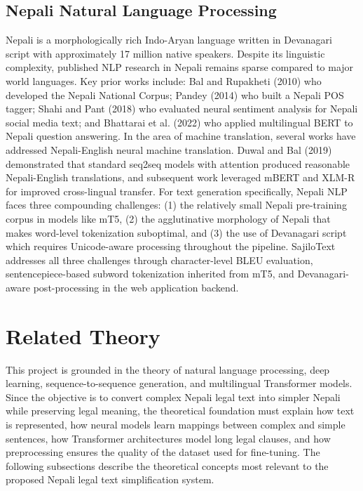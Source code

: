 \documentclass[12pt]{report}
\begin{document}
\subsection{Nepali Natural Language Processing} 
Nepali is a morphologically rich Indo-Aryan language written in Devanagari script with approximately 17 million native speakers. Despite its linguistic complexity, published NLP research in Nepali remains sparse compared to major world languages.
Key prior works include: Bal and Rupakheti (2010) who developed the Nepali National Corpus; Pandey (2014) who built a Nepali POS tagger; Shahi and Pant (2018) who evaluated neural sentiment analysis for Nepali social media text; and Bhattarai et al. (2022) who applied multilingual BERT to Nepali question answering.
In the area of machine translation, several works have addressed Nepali-English neural machine translation. Duwal and Bal (2019) demonstrated that standard seq2seq models with attention produced reasonable Nepali-English translations, and subsequent work leveraged mBERT and XLM-R for improved cross-lingual transfer.
For text generation specifically, Nepali NLP faces three compounding challenges: (1) the relatively small Nepali pre-training corpus in models like mT5, (2) the agglutinative morphology of Nepali that makes word-level tokenization suboptimal, and (3) the use of Devanagari script which requires Unicode-aware processing throughout the pipeline. SajiloText addresses all three challenges through character-level BLEU evaluation, sentencepiece-based subword tokenization inherited from mT5, and Devanagari-aware post-processing in the web application backend.

\section{Related Theory}

This project is grounded in the theory of natural language processing, deep learning, sequence-to-sequence generation, and multilingual Transformer models. Since the objective is to convert complex Nepali legal text into simpler Nepali while preserving legal meaning, the theoretical foundation must explain how text is represented, how neural models learn mappings between complex and simple sentences, how Transformer architectures model long legal clauses, and how preprocessing ensures the quality of the dataset used for fine-tuning. The following subsections describe the theoretical concepts most relevant to the proposed Nepali legal text simplification system.
\end{document}
